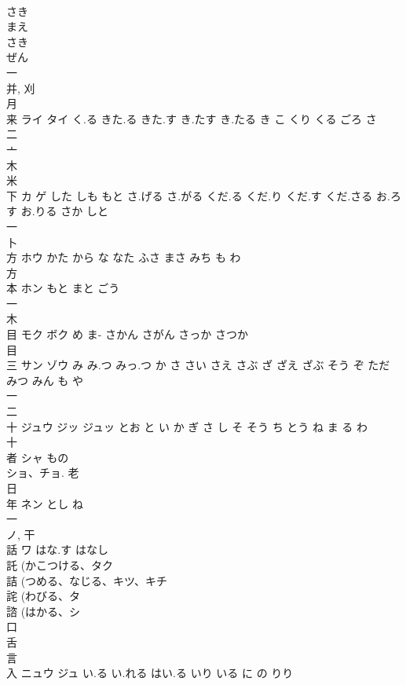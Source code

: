 \documentclass[8pt]{extreport}
\begin{document}
\begin{CJK}{UTF8}{min}
\\	さき 
\\	まえ 
\\	さき 
\\	ぜん 
\\	一 
\\	并, 刈 
\\	月 
\\	来	ライ タイ	く.る きた.る きた.す き.たす き.たる き こ くり くる ごろ さ	
\\	二 
\\	亠 
\\	木 
\\	米 
\\	下	カ ゲ	した しも もと さ.げる さ.がる くだ.る くだ.り くだ.す くだ.さる お.ろす お.りる さか しと	
\\	一 
\\	卜 
\\	方	ホウ	かた から な なた ふさ まさ みち も わ	
\\	方 
\\	本	ホン	もと まと ごう	
\\	一 
\\	木 
\\	目	モク ボク	め ま- さかん さがん さっか さつか	
\\	目 
\\	三	サン ゾウ	み み.つ みっ.つ か さ さい さえ さぶ ざ ざえ ざぶ そう ぞ ただ みつ みん も や	
\\	一 
\\	二 
\\	十	ジュウ ジッ ジュッ	とお と い か ぎ さ し そ そう ち とう ね ま る わ	
\\	十 
\\	者	シャ	もの	
\\	ショ、チョ.			老 
\\	日 
\\	年	ネン	とし ね	
\\	一 
\\	ノ, 干 
\\	話	ワ	はな.す はなし	
\\	託 (かこつける、タク 
\\	詰 (つめる、なじる、キツ、キチ 
\\	詫 (わびる、タ 
\\	諮 (はかる、シ 
\\	口 
\\	舌 
\\	言 
\\	入	ニュウ ジュ	い.る い.れる はい.る いり いる に の りり	

\end{CJK}
\end{document}
